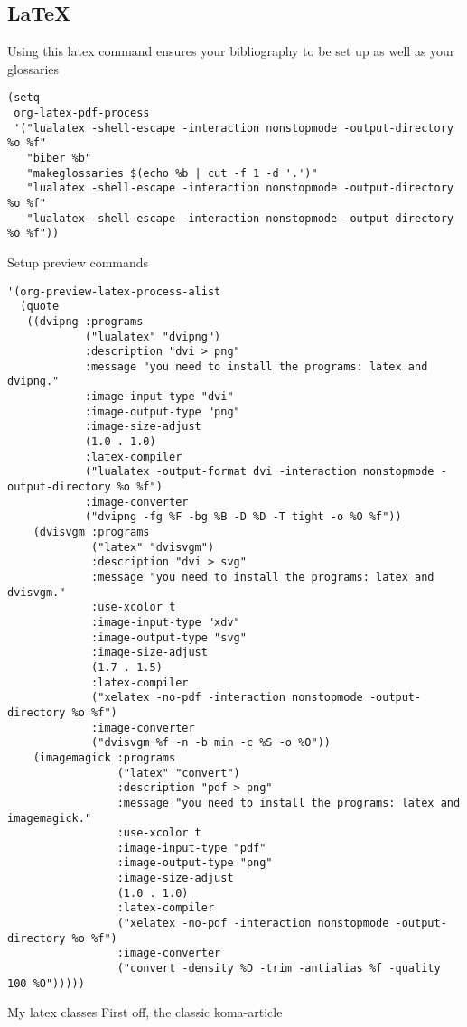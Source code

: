 \documentclass[11pt]{article}
\begin{document}
\subsection{\LaTeX{}}
\label{sec:org9fc8717}
Using this latex command ensures your bibliography to be set up as well as your glossaries
\begin{verbatim}
(setq
 org-latex-pdf-process
 '("lualatex -shell-escape -interaction nonstopmode -output-directory %o %f"
   "biber %b"
   "makeglossaries $(echo %b | cut -f 1 -d '.')"
   "lualatex -shell-escape -interaction nonstopmode -output-directory %o %f"
   "lualatex -shell-escape -interaction nonstopmode -output-directory %o %f"))
\end{verbatim}
Setup preview commands
\begin{verbatim}
'(org-preview-latex-process-alist
  (quote
   ((dvipng :programs
            ("lualatex" "dvipng")
            :description "dvi > png"
            :message "you need to install the programs: latex and dvipng."
            :image-input-type "dvi"
            :image-output-type "png"
            :image-size-adjust
            (1.0 . 1.0)
            :latex-compiler
            ("lualatex -output-format dvi -interaction nonstopmode -output-directory %o %f")
            :image-converter
            ("dvipng -fg %F -bg %B -D %D -T tight -o %O %f"))
    (dvisvgm :programs
             ("latex" "dvisvgm")
             :description "dvi > svg"
             :message "you need to install the programs: latex and dvisvgm."
             :use-xcolor t
             :image-input-type "xdv"
             :image-output-type "svg"
             :image-size-adjust
             (1.7 . 1.5)
             :latex-compiler
             ("xelatex -no-pdf -interaction nonstopmode -output-directory %o %f")
             :image-converter
             ("dvisvgm %f -n -b min -c %S -o %O"))
    (imagemagick :programs
                 ("latex" "convert")
                 :description "pdf > png"
                 :message "you need to install the programs: latex and imagemagick."
                 :use-xcolor t
                 :image-input-type "pdf"
                 :image-output-type "png"
                 :image-size-adjust
                 (1.0 . 1.0)
                 :latex-compiler
                 ("xelatex -no-pdf -interaction nonstopmode -output-directory %o %f")
                 :image-converter
                 ("convert -density %D -trim -antialias %f -quality 100 %O")))))
\end{verbatim}
My latex classes
First off, the classic koma-article
\end{document}
